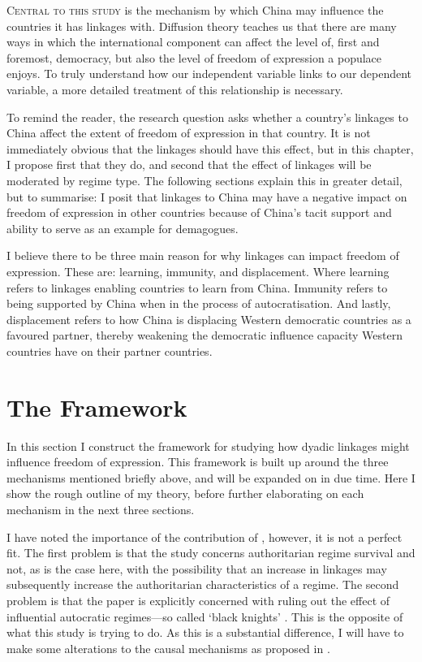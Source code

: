 \lettrine{C}{entral to this study} is the mechanism by which China may influence the countries it has linkages with. Diffusion theory teaches us that there are many ways in which the international component can affect the level of, first and foremost, democracy, but also the level of freedom of expression a populace enjoys. To truly understand how our independent variable links to our dependent variable, a more detailed treatment of this relationship is necessary.

To remind the reader, the research question asks whether a country's linkages to China affect the extent of freedom of expression in that country. It is not immediately obvious that the linkages should have this effect, but in this chapter, I propose first that they do, and second that the effect of linkages will be moderated by regime type. The following sections explain this in greater detail, but to summarise: I posit that linkages to China may have a negative impact on freedom of expression in other countries because of China's tacit support and ability to serve as an example for demagogues. 

I believe there to be three main reason for why linkages can impact freedom of expression. These are: learning, immunity, and displacement. Where learning refers to linkages enabling countries to learn from China. Immunity refers to being supported by China when in the process of autocratisation. And lastly, displacement refers to how China is displacing Western democratic countries as a favoured partner, thereby weakening the democratic influence capacity Western countries have on their partner countries.

\section{The Framework}
In this section I construct the framework for studying how dyadic linkages might influence freedom of expression. This framework is built up around the three mechanisms mentioned briefly above, and will be expanded on in due time. Here I show the rough outline of my theory, before further elaborating on each mechanism in the next three sections. 

I have noted the importance of the contribution of \citet{tansey_ties_2017}, however, it is not a perfect fit. The first problem is that the study concerns authoritarian regime survival and not, as is the case here, with the possibility that an increase in linkages may subsequently increase the authoritarian characteristics of a regime. The second problem is that the \citeauthor{tansey_ties_2017} paper is explicitly concerned with ruling out the effect of influential autocratic regimes---so called `black knights' \citep[p.1232]{tansey_ties_2017}. This is the opposite of what this study is trying to do. As this is a substantial difference, I will have to make some alterations to the causal mechanisms as proposed in \citet{tansey_ties_2017}. 

